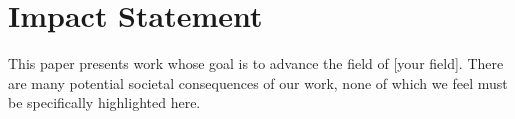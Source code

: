 
\section*{Impact Statement}
%
%


\label{sec:impact}

This paper presents work whose goal is to advance the field of [your field]. There are many potential societal consequences of our work, none of which we feel must be specifically highlighted here.






